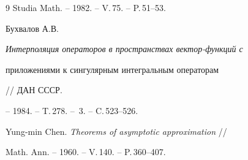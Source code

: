 \begin{thebibliography}{9}
Studia Math. -- 1982. -- V.\,75. -- P.\,51--53.







Бухвалов А.В. {\em Интерполяция операторов в пространствах вектор-функций с 


приложениями к сингулярным интегральным операторам} // ДАН СССР.


-- 1984. -- T.\,278. -- \No\,3. -- C.\,523--526.







Yung-min Chen. {\em Theorems of asymptotic approximation} // 


Math. Ann. -- 1960. -- V.\,140. -- P.\,360--407.





\end{thebibliography}





\vskip 2cm














\label{end}












































